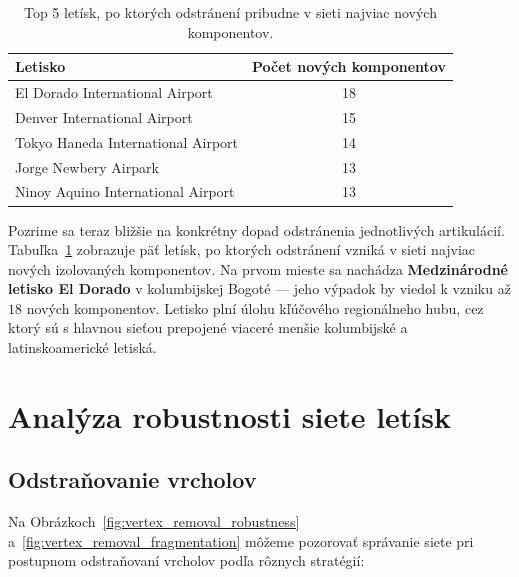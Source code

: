 \begin{table}[H]
    \centering
    \begin{tabular}{l c}
        \toprule
        \textbf{Letisko}                   & \textbf{Počet nových komponentov} \\
        \midrule
        El Dorado International Airport    & 18                                \\
        Denver International Airport       & 15                                \\
        Tokyo Haneda International Airport & 14                                \\
        Jorge Newbery Airpark              & 13                                \\
        Ninoy Aquino International Airport & 13                                \\
        \bottomrule
    \end{tabular}
    \caption{\centering Top 5 letísk, po ktorých odstránení pribudne v sieti najviac nových komponentov.}
    \label{tab:top_impact_airports}
\end{table}

Pozrime sa teraz bližšie na konkrétny dopad odstránenia jednotlivých artikulácií. Tabuľka~\ref{tab:top_impact_airports} zobrazuje päť letísk, po ktorých odstránení vzniká v sieti najviac nových izolovaných komponentov. Na prvom mieste sa nachádza \textbf{Medzinárodné letisko El Dorado} v kolumbijskej Bogoté — jeho výpadok by viedol k vzniku až $18$ nových komponentov. Letisko plní úlohu kľúčového regionálneho hubu, cez ktorý sú s hlavnou sieťou prepojené viaceré menšie kolumbijské a latinskoamerické letiská.

\section{Analýza robustnosti siete letísk}

\subsection{Odstraňovanie vrcholov}

Na Obrázkoch~\ref{fig:vertex_removal_robustness} a~\ref{fig:vertex_removal_fragmentation} môžeme pozorovať správanie siete pri postupnom odstraňovaní vrcholov podľa rôznych stratégií:

